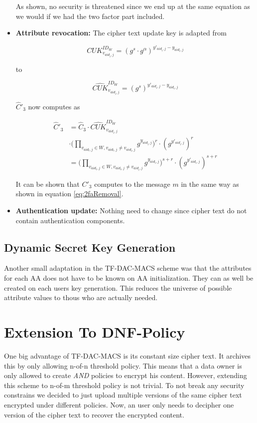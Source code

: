 \begin{itemize}
As shown, no security is threatened since we end up at the same equation as we would if we had the two factor part included. 

\item \textbf{Attribute revocation:}
The cipher text update key is adapted from

$$
CUK^{ID_W}_{v_{aid_i,j}} = (g^s \cdotp g^\alpha)^{y'_{aid_i,j} - y_{aid_i,j}}
$$

to 

$$
\widehat{CUK}^{ID_W}_{v_{aid_i,j}} = (g^s)^{y'_{aid_i,j} - y_{aid_i,j}}
$$

$\widehat{C}'_3$ now computes as 

\begin{equation}
\begin{split}
\widehat{C}'_3 &= \widehat{C}_3 \cdotp \widehat{CUK}^{ID_W}_{v_{aid_i,j}} \\
&\cdotp \Big( \prod_{v_{aid_{t}, j}\in W, v_{aid_t, j} \neq v_{aid_i,j}} g^{y_{aid_{i}, j}} \Big)^{r} \cdotp (g^{y'_{aid_i,j}})^{r} \\
&= \Big( \prod_{v_{aid_{t}, j}\in W, v_{aid_t, j} \neq v_{aid_i,j}} g^{y_{aid_{i}, j}} \Big)^{s + r} \cdotp (g^{y'_{aid_i,j}})^{s + r}
\end{split}
\end{equation}

It can be shown that $C'_3$ computes to the message $m$ in the same way as shown in equation \ref{eq:2faRemoval}.

\item \textbf{Authentication update:}
Nothing need to change since cipher text do not contain authentication components. 
\end{itemize}

\subsection{Dynamic Secret Key Generation}
Another small adaptation in the \ac{TF-DAC-MACS} scheme was that the attributes for each \ac{AA} does not have to be known on AA initialization. They can as well be created on each users key generation. This reduces the universe of possible attribute values to thous who are actually needed.

\section{Extension To DNF-Policy}
One big advantage of TF-DAC-MACS is its constant size cipher text. It archives this by only allowing n-of-n threshold policy. This means that a data owner is only allowed to create \textit{AND} policies to encrypt his content. However, extending this scheme to n-of-m threshold policy is not trivial. To not break any security constrains we decided to just upload multiple versions of the same cipher text encrypted under different policies. Now, an user only needs to decipher one version of the cipher text to recover the encrypted content. 


